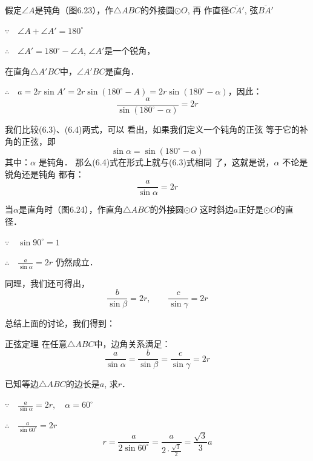 假定$\angle A$是钝角（图6.23），作$\triangle ABC$的外接圆$\odot O$, 再
作直径$\overline{CA'}$, 弦$\overline{BA'}$

$\because\quad \angle A+\angle A'=180^{\circ}$

$\therefore\quad \angle A'=180^{\circ}-\angle A$, $\angle A'$是一个锐角，

在直角$\triangle A'BC$中，$\angle A'BC$是直角．

$\therefore\quad a=2r\sin A'=2r\sin(180^{\circ}-A)=2r\sin(180^{\circ}-\alpha)$，因此：
\begin{equation}
    \frac{a}{\sin(180^{\circ}-\alpha)}=2r
\end{equation}

我们比较(6.3)、(6.4)两式，可以
看出，如果我们定义一个钝角的正弦
等于它的补角的正弦，即
\[\sin\alpha  =\sin(180^{\circ}-\alpha )\]
其中：$\alpha$ 是钝角．
那么(6.4)式在形式上就与(6.3)式相同
了，这就是说，$\alpha$ 不论是锐角还是钝角
都有：
\[\frac{a}{\sin\alpha}=2r\]

\begin{figure}[htp]
    \centering
{}
    \caption{}
\end{figure}

当$\alpha$是直角时（图6.24），作直角$\triangle ABC$的外接圆$\odot O$
这时斜边$a$正好是$\odot O$的直径．

$\because\quad \sin90^{\circ}=1$

$\therefore\quad \frac{a}{\sin\alpha}=2r$
仍然成立．

同理，我们还可得出，
\[\frac{b}{\sin\beta}=2r,\qquad \frac{c}{\sin\gamma}=2r\]

总结上面的讨论，我们得到：

\begin{blk}
    {正弦定理}
在任意$\triangle ABC$中，边角关系满足：
\[\frac{a}{\sin\alpha}=\frac{b}{\sin\beta}=\frac{c}{\sin\gamma}=2r\]
\end{blk}

\begin{example}
    已知等边$\triangle ABC$的边长是$a$, 求$r$．
\end{example}

\begin{solution}
$\because\quad \frac{a}{\sin\alpha}=2r,\quad \alpha=60^{\circ}$

$\therefore\quad \frac{a}{\sin60^{\circ}}=2r$
\[r=\frac{a}{2\sin60^{\circ}}=\frac{a}{2\cdot \frac{\sqrt{3}}{2}}=\frac{\sqrt{3}}{3}a\]
\end{solution}

